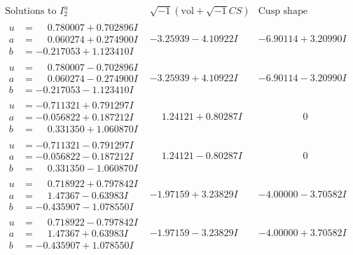 \documentclass[1p]{elsarticle_modified}
\theoremstyle{definition}
\newcommand{\I}{\sqrt{-1}}
\begin{document}
$$\begin{array}{c|c|c}  
\text{Solutions to }I^u_{2}& \I (\text{vol} + \sqrt{-1}CS) & \text{Cusp shape}\\
 \hline 
\begin{aligned}
u &= \phantom{-}0.780007 + 0.702896 I \\
a &= \phantom{-}0.060274 + 0.274900 I \\
b &= -0.217053 + 1.123410 I\end{aligned}
 & -3.25939 - 4.10922 I & -6.90114 + 3.20990 I \\ \hline\begin{aligned}
u &= \phantom{-}0.780007 - 0.702896 I \\
a &= \phantom{-}0.060274 - 0.274900 I \\
b &= -0.217053 - 1.123410 I\end{aligned}
 & -3.25939 + 4.10922 I & -6.90114 - 3.20990 I \\ \hline\begin{aligned}
u &= -0.711321 + 0.791297 I \\
a &= -0.056822 + 0.187212 I \\
b &= \phantom{-}0.331350 + 1.060870 I\end{aligned}
 & \phantom{-}1.24121 + 0.80287 I & \phantom{-0.000000 } 0 \\ \hline\begin{aligned}
u &= -0.711321 - 0.791297 I \\
a &= -0.056822 - 0.187212 I \\
b &= \phantom{-}0.331350 - 1.060870 I\end{aligned}
 & \phantom{-}1.24121 - 0.80287 I & \phantom{-0.000000 } 0 \\ \hline\begin{aligned}
u &= \phantom{-}0.718922 + 0.797842 I \\
a &= \phantom{-}1.47367 - 0.63983 I \\
b &= -0.435907 - 1.078550 I\end{aligned}
 & -1.97159 + 3.23829 I & -4.00000 - 3.70582 I \\ \hline\begin{aligned}
u &= \phantom{-}0.718922 - 0.797842 I \\
a &= \phantom{-}1.47367 + 0.63983 I \\
b &= -0.435907 + 1.078550 I\end{aligned}
 & -1.97159 - 3.23829 I & -4.00000 + 3.70582 I \\ \hline\begin{aligned}

\end{aligned}
\end{array}$$
\end{document}
